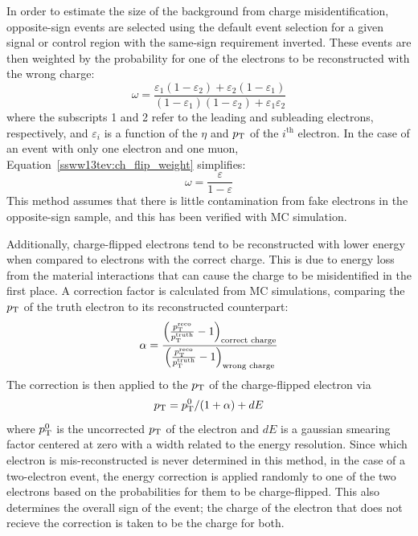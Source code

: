 In order to estimate the size of the background from charge misidentification, opposite-sign events are selected using the default event selection for a given signal or control region with the same-sign requirement inverted.
These events are then weighted by the probability for one of the electrons to be reconstructed with the wrong charge:
\begin{equation}
\omega = \frac{\varepsilon_1(1-\varepsilon_2)+\varepsilon_2(1-\varepsilon_1)}{(1-\varepsilon_1)(1-\varepsilon_2)+\varepsilon_1\varepsilon_2}
\label{ssww13tev:ch_flip_weight}
\end{equation}
where the subscripts 1 and 2 refer to the leading and subleading electrons, respectively, and $\varepsilon_i$ is a function of the $\eta$ and $p_{\mathrm{T}}$ of the $i^{\textrm{th}}$ electron.
In the case of an event with only one electron and one muon, Equation~\ref{ssww13tev:ch_flip_weight} simplifies:
\begin{equation}
\omega = \frac{\varepsilon}{1-\varepsilon}
\end{equation}
This method assumes that there is little contamination from fake electrons in the opposite-sign sample, and this has been verified with MC simulation.

Additionally, charge-flipped electrons tend to be reconstructed with lower energy when compared to electrons with the correct charge.
This is due to energy loss from the material interactions that can cause the charge to be misidentified in the first place.
A correction factor is calculated from MC simulations, comparing the $p_{\mathrm{T}}$ of the truth electron to its reconstructed counterpart:
\begin{equation}
\alpha = \frac{\Big(\frac{\pt^{\textrm{reco}}}{\pt^{\textrm{truth}}}-1\Big)_{\textrm{correct charge}}}{\Big(\frac{\pt^{\textrm{reco}}}{\pt^{\textrm{truth}}}-1\Big)_{\textrm{wrong charge}}}
\label{ssww13tev:ch_flip_alpha}
\end{equation}
The correction is then applied to the $p_{\mathrm{T}}$ of the charge-flipped electron via
\begin{equation}
\pt = \pt^0/(1+\alpha)+dE
\label{ssww13tev:ch_flip_energy_corr}
\end{equation}
where $p_{\mathrm{T}}^0$ is the uncorrected $p_{\mathrm{T}}$ of the electron and $dE$ is a gaussian smearing factor centered at zero with a width related to the energy resolution.
Since which electron is mis-reconstructed is never determined in this method, in the case of a two-electron event, the energy correction is applied randomly to one of the two electrons based on the probabilities for them to be charge-flipped.
This also determines the overall sign of the event; the charge of the electron that does not recieve the correction is taken to be the charge for both.


